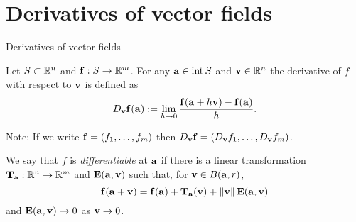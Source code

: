 




\section{Derivatives of vector fields}



 {Derivatives of vector fields}

\begin{definition}
    Let \(S\subset \bR^n\) and \(\ff:S\to \bR^m\).
    For any \(\aa \in \operatorname{int}S\) and \(\vv \in \bR^n\) the derivative of \(f\) with respect to \(\vv\) is defined as
    \[
        D_{\vv}\ff(\aa) :=
        \lim_{h\to 0} \frac{\ff(\aa+h \vv) - \ff(\aa)}{h}.
    \]
\end{definition}

Note: If we write \(\ff = (f_1,\ldots,f_m)\) then \(D_{\vv}\ff = (D_{\vv}f_1,\ldots,D_{\vv} f_m)\).


\begin{definition}[Differentiable]
    We say that \(f\) is \emph{differentiable} at \(\aa\) if there is a linear transformation \(\mathbf{T}_\aa : \bR^n \to \bR^m\) and \(\mathbf{E}(\aa,\vv)\) such that, for \(\vv\in B(\aa,r)\),
    \[
        \ff(\aa+\vv) = \ff(\aa) + \mathbf{T}_\aa  (\vv )+ \norm{\vv}\mathbf{E}(\aa,\vv)
    \]
    and \(\mathbf{E}(\aa,\vv) \to 0\) as \(\vv \to 0\).
\end{definition}




